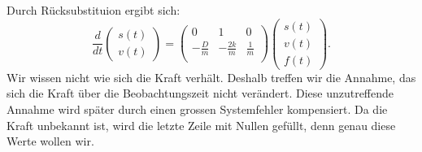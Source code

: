 Durch Rücksubstituion ergibt sich:
\begin{equation}
\frac{d}{dt} \left(\begin{array}{c} s(t) \\ v(t) \end{array}\right) = \left(
 \begin{array}{ccc} 	
0 & 1& 0 \\ 
- \frac{D}{m} &-\frac{2k}{m} & \frac{1} {m}\\
\end{array}\right)  \left(\begin{array}{c} s(t)\\ v(t)\\ f(t) \end{array}\right).
\end{equation}
Wir wissen nicht wie sich die Kraft verhält. 
Deshalb treffen wir die Annahme, das sich die Kraft über die Beobachtungszeit nicht verändert. 
Diese unzutreffende Annahme wird später durch einen grossen Systemfehler kompensiert. 
Da die Kraft unbekannt ist, wird die letzte Zeile mit Nullen gefüllt, denn genau diese Werte wollen wir. 











